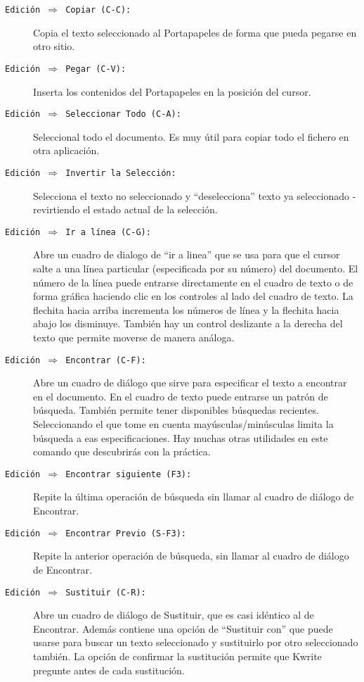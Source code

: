 \begin{description}
\item[{\tt  Edición  $\Rightarrow$  Copiar  (C-C):}]  Copia  el  texto
seleccionado al Portapapeles de forma que pueda pegarse en otro sitio.

\item[{\tt Edición $\Rightarrow$ Pegar (C-V):}] Inserta los contenidos
del Portapapeles en la posición del cursor.

\item[{\tt Edición $\Rightarrow$ Seleccionar Todo (C-A):}] Seleccional
todo el  documento. Es muy  útil para copiar  todo el fichero  en otra
aplicación.

\item[{\tt Edición  $\Rightarrow$ Invertir la  Selección:}] Selecciona
el  texto no  seleccionado  y ``deselecciona''  texto ya  seleccionado
-revirtiendo el estado actual de la selección.

\item[{\tt Edición $\Rightarrow$ Ir a línea (C-G):}] Abre un cuadro de
dialogo de ``ir  a linea'' que se  usa para que el cursor  salte a una
línea particular (especificada por su número) del documento. El número
de la  línea puede entrarse  directamente en el  cuadro de texto  o de
forma gráfica  haciendo clic en  los controles  al lado del  cuadro de
texto. La flechita  hacia arriba incrementa los números de  línea y la
flechita hacia abajo los disminuye.  También hay un control deslizante
a la derecha del texto que permite moverse de manera análoga.

\item[{\tt Edición $\Rightarrow$ Encontrar  (C-F):}] Abre un cuadro de
diálogo  que  sirve  para  especificar  el texto  a  encontrar  en  el
documento. En el cuadro de texto puede entrarse un patrón de búsqueda.
También permite  tener disponibles búsquedas  recientes. Seleccionando
el que tome  en cuenta mayúsculas/minúsculas limita la  búsqueda a eas
especificaciones.  Hay muchas  otras  utilidades en  este comando  que
descubrirás con la práctica.

\item[{\tt Edición $\Rightarrow$ Encontrar siguiente (F3):}] Repite la
última  operación de  búsqueda  sin  llamar al  cuadro  de diálogo  de
Encontrar.

\item[{\tt Edición $\Rightarrow$ Encontrar  Previo (S-F3):}] Repite la
anterior operación  de búsqueda,  sin llamar al  cuadro de  diálogo de
Encontrar.

\item[{\tt Edición $\Rightarrow$ Sustituir  (C-R):}] Abre un cuadro de
diálogo de  Sustituir, que  es casi idéntico  al de  Encontrar. Además
contiene una opción de ``Sustituir  con'' que puede usarse para buscar
un texto seleccionado y sustituirlo  por otro seleccionado también. La
opción de confirmar  la sustitución permite que  {\sf Kwrite} pregunte
antes de cada sustitución.


\end{description}
